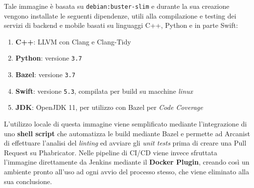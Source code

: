 \documentclass[../main.tex]{subfiles}
\begin{document}
    	    Tale immagine è basata su \verb|debian:buster-slim| e durante la sua creazione vengono installate le seguenti dipendenze, utili alla compilazione e testing dei servizi di backend e mobile basati su linguaggi C++, Python e in parte Swift:
            \begin{enumerate}
                \item \textbf{C++}: LLVM con Clang e Clang-Tidy
                \item \textbf{Python}: versione \verb|3.7|
                \item \textbf{Bazel}: versione \verb|3.7|
                \item \textbf{Swift}: versione \verb|5.3|, compilata per build su macchine \emph{linux}
                \item \textbf{JDK}: OpenJDK 11, per utilizzo con Bazel per \emph{Code Coverage}
            \end{enumerate}

            L'utilizzo locale di questa immagine viene semplificato mediante l'integrazione di uno \textbf{shell script} che automatizza le build mediante Bazel e permette ad Arcanist di effettuare l'analisi del \emph{linting} ed avviare gli \emph{unit tests} prima di creare una Pull Request su Phabricator. Nelle pipeline di CI/CD viene invece sfruttata l'immagine direttamente da Jenkins mediante il \textbf{Docker Plugin}, creando così un ambiente pronto all'uso ad ogni avvio del processo stesso, che viene eliminato alla sua conclusione.
            
\end{document}
